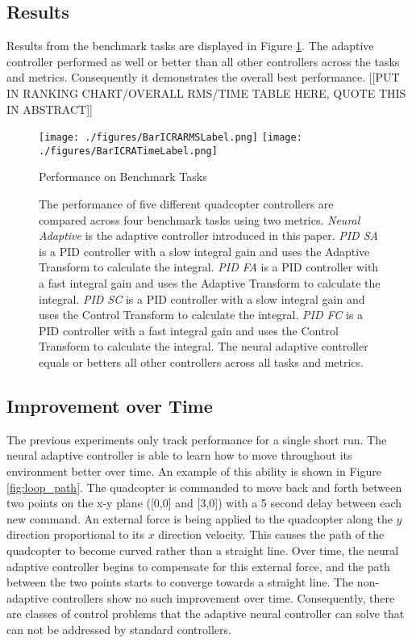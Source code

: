 \documentclass[letterpaper, 10 pt, conference]{ieeeconf}  %
\begin{document}
\subsection{Results}

Results from the benchmark tasks are displayed in Figure \ref{fig:Benchmarks}.
The adaptive controller performed as well or better than all other controllers across the tasks and metrics.
Consequently it demonstrates the overall best performance.
[[PUT IN RANKING CHART/OVERALL RMS/TIME TABLE HERE, QUOTE THIS IN ABSTRACT]]


\begin{figure}
\centering
\texttt{[image: ./figures/BarICRARMSLabel.png]}
\texttt{[image: ./figures/BarICRATimeLabel.png]}
\caption{Performance on Benchmark Tasks}
\label{fig:Benchmarks}
\captionsetup{singlelinecheck=off,font=footnotesize}
\caption*{The performance of five different quadcopter controllers are compared across four benchmark tasks using two metrics. \textit{Neural Adaptive} is the adaptive controller introduced in this paper. \textit{PID SA} is a PID controller with a slow integral gain and uses the Adaptive Transform to calculate the integral. \textit{PID FA} is a PID controller with a fast integral gain and uses the Adaptive Transform to calculate the integral. \textit{PID SC} is a PID controller with a slow integral gain and uses the Control Transform to calculate the integral. \textit{PID FC} is a PID controller with a fast integral gain and uses the Control Transform to calculate the integral. The neural adaptive controller equals or betters all other controllers across all tasks and metrics.}
\end{figure}


\subsection{Improvement over Time}

The previous experiments only track performance for a single short run. 
The neural adaptive controller is able to learn how to move throughout its environment better over time.
An example of this ability is shown in Figure \ref{fig:loop_path}.
The quadcopter is commanded to move back and forth between two points on the x-y plane ([0,0] and [3,0]) with a 5 second delay between each new command.
An external force is being applied to the quadcopter along the $y$ direction proportional to its $x$ direction velocity.
This causes the path of the quadcopter to become curved rather than a straight line.
Over time, the neural adaptive controller begins to compensate for this external force, and the path between the two points starts to converge towards a straight line.
The non-adaptive controllers show no such improvement over time.
Consequently, there are classes of control problems that the adaptive neural controller can solve that can not be addressed by standard controllers.
\end{document}
